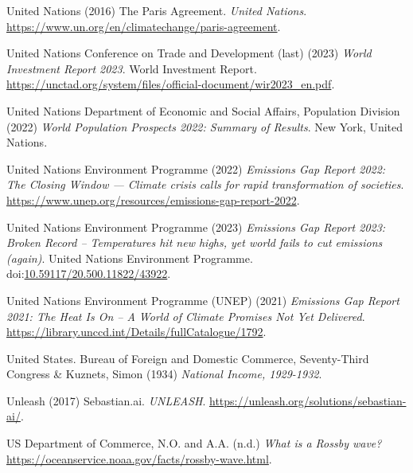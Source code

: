 \documentclass[
  letterpaper,
  DIV=11,
  numbers=noendperiod]{scrartcl}
\newlength{\cslhangindent}
\newenvironment{CSLReferences}[2] %
 {\begin{list}{}{%
  \setlength{\itemindent}{0pt}
  \setlength{\leftmargin}{0pt}
  \setlength{\parsep}{0pt}
  \ifodd #1
   \setlength{\leftmargin}{\cslhangindent}
   \setlength{\itemindent}{-1\cslhangindent}
  \fi
  \setlength{\itemsep}{#2\baselineskip}}}
 {\end{list}}
\begin{document}
\begin{CSLReferences}{0}{1}
United Nations (2016) The {Paris Agreement}. \emph{United Nations}.
\url{https://www.un.org/en/climatechange/paris-agreement}.

United Nations Conference on Trade and Development (last) (2023)
\emph{World {Investment Report} 2023}. World {Investment Report}.
\url{https://unctad.org/system/files/official-document/wir2023_en.pdf}.

United Nations Department of Economic and Social Affairs, Population
Division (2022) \emph{World {Population Prospects} 2022: {Summary} of
{Results}}. New York, United Nations.

United Nations Environment Programme (2022) \emph{Emissions {Gap Report}
2022: {The Closing Window} --- {Climate} crisis calls for rapid
transformation of societies}.
\url{https://www.unep.org/resources/emissions-gap-report-2022}.

United Nations Environment Programme (2023) \emph{Emissions {Gap Report}
2023: {Broken Record} -- {Temperatures} hit new highs, yet world fails
to cut emissions (again)}. United Nations Environment Programme.
doi:\href{https://doi.org/10.59117/20.500.11822/43922}{10.59117/20.500.11822/43922}.

United Nations Environment Programme (UNEP) (2021) \emph{Emissions {Gap
Report} 2021: {The Heat Is On} -- {A World} of {Climate Promises Not Yet
Delivered}}. \url{https://library.unccd.int/Details/fullCatalogue/1792}.

United States. Bureau of Foreign and Domestic Commerce, Seventy-Third
Congress \& Kuznets, Simon (1934) \emph{National {Income}, 1929-1932}.

Unleash (2017) Sebastian.ai. \emph{UNLEASH}.
\url{https://unleash.org/solutions/sebastian-ai/}.

US Department of Commerce, N.O. and A.A. (n.d.) \emph{What is a {Rossby}
wave?} \url{https://oceanservice.noaa.gov/facts/rossby-wave.html}.


\end{CSLReferences}
\end{document}
